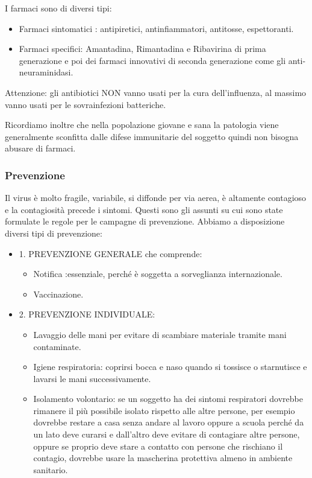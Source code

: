 I farmaci sono di diversi tipi:
\begin{itemize}
\item 
  Farmaci sintomatici : antipiretici, antinfiammatori, antitosse,
espettoranti.
\item 
  Farmaci specifici: Amantadina, Rimantadina e Ribavirina di prima
generazione e poi dei farmaci innovativi di seconda generazione come gli
anti-neuraminidasi.
\end{itemize}
Attenzione: gli antibiotici NON vanno usati per la cura dell'influenza,
al massimo vanno usati per le sovrainfezioni batteriche.

Ricordiamo inoltre che nella popolazione giovane e sana la patologia
viene generalmente sconfitta dalle difese immunitarie del soggetto
quindi non bisogna abusare di farmaci.

\subsubsection{Prevenzione}


Il virus è molto fragile, variabile, si diffonde per via aerea, è
altamente contagioso e la contagiosità precede i sintomi. Questi sono
gli assunti su cui sono state formulate le regole per le campagne di
prevenzione. Abbiamo a disposizione diversi tipi di prevenzione:
\begin{itemize}
\item 
1. PREVENZIONE GENERALE che comprende:
\begin{itemize}
\item 
  Notifica :essenziale, perché è soggetta a sorveglianza internazionale.
\item 
  Vaccinazione.
\end{itemize}
\item 
2. PREVENZIONE INDIVIDUALE:
\begin{itemize}
\item 
  Lavaggio delle mani per evitare di scambiare materiale tramite mani
contaminate.
\item 
  Igiene respiratoria: coprirsi bocca e naso quando si tossisce o
starnutisce e lavarsi le mani successivamente.
\item 
  Isolamento volontario: se un soggetto ha dei sintomi respiratori
dovrebbe rimanere il più possibile isolato rispetto alle altre persone,
per esempio dovrebbe restare a casa senza andare al lavoro oppure a
scuola perché da un lato deve curarsi e dall'altro deve evitare di
contagiare altre persone, oppure se proprio deve stare a contatto con
persone che rischiano il contagio, dovrebbe usare la mascherina
protettiva almeno in ambiente sanitario.
\end{itemize}
\end{itemize}
